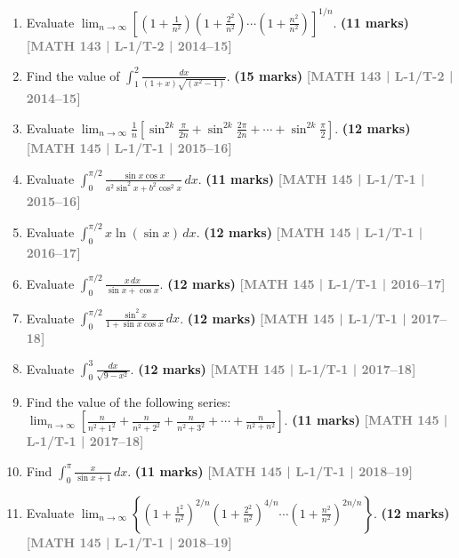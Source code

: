 \documentclass[12pt,a4paper]{article}
\newcommand{\yr}[1]{\hfill\textcolor{gray}{\small\textbf{[#1]}}}
\newcommand{\mk}[1]{\textcolor{orange!70!black}{\small\textbf{(#1 marks)}}}
\begin{document}
\begin{enumerate}
\item Evaluate $\displaystyle\lim_{n\to\infty}\left[\left(1+\frac{1}{n^{2}}\right)\left(1+\frac{2^{2}}{n^{2}}\right)\cdots\left(1+\frac{n^{2}}{n^{2}}\right)\right]^{1/n}$.
\mk{11\textonehalf} \yr{MATH 143 | L-1/T-2 | 2014--15}

\item Find the value of $\displaystyle\int_{1}^{2}\frac{dx}{(1+x)\sqrt{(x^{2}-1)}}$.
\mk{15} \yr{MATH 143 | L-1/T-2 | 2014--15}

\item Evaluate $\displaystyle\lim_{n\to\infty}\frac{1}{n}\left[\sin^{2k}\!\frac{\pi}{2n}+\sin^{2k}\!\frac{2\pi}{2n}+\cdots+\sin^{2k}\!\frac{\pi}{2}\right]$.
\mk{12} \yr{MATH 145 | L-1/T-1 | 2015--16}

\item Evaluate $\displaystyle\int_{0}^{\pi/2}\frac{\sin x\cos x}{a^{2}\sin^{2}x+b^{2}\cos^{2}x}\,dx$.
\mk{11} \yr{MATH 145 | L-1/T-1 | 2015--16}

\item Evaluate $\displaystyle\int_{0}^{\pi/2}x\ln(\sin x)\,dx$.
\mk{12} \yr{MATH 145 | L-1/T-1 | 2016--17}

\item Evaluate $\displaystyle\int_{0}^{\pi/2}\frac{x\,dx}{\sin x+\cos x}$.
\mk{12} \yr{MATH 145 | L-1/T-1 | 2016--17}

\item Evaluate $\displaystyle\int_{0}^{\pi/2}\frac{\sin^{2}x}{1+\sin x\cos x}\,dx$.
\mk{12} \yr{MATH 145 | L-1/T-1 | 2017--18}

\item Evaluate $\displaystyle\int_{0}^{3}\frac{dx}{\sqrt{9-x^{2}}}$.
\mk{12} \yr{MATH 145 | L-1/T-1 | 2017--18}

\item Find the value of the following series: $\displaystyle\lim_{n\to\infty}\left[\frac{n}{n^{2}+1^{2}}+\frac{n}{n^{2}+2^{2}}+\frac{n}{n^{2}+3^{2}}+\cdots+\frac{n}{n^{2}+n^{2}}\right]$.
\mk{11} \yr{MATH 145 | L-1/T-1 | 2017--18}

\item Find $\displaystyle\int_{0}^{\pi}\frac{x}{\sin x+1}\,dx$.
\mk{11} \yr{MATH 145 | L-1/T-1 | 2018--19}

\item Evaluate $\displaystyle\lim_{n\to\infty}\left\{\left(1+\frac{1^{2}}{n^{2}}\right)^{2/n}\!\!\left(1+\frac{2^{2}}{n^{2}}\right)^{4/n}\!\!\cdots\left(1+\frac{n^{2}}{n^{2}}\right)^{2n/n}\right\}$.
\mk{12} \yr{MATH 145 | L-1/T-1 | 2018--19}


\end{enumerate}
\end{document}
